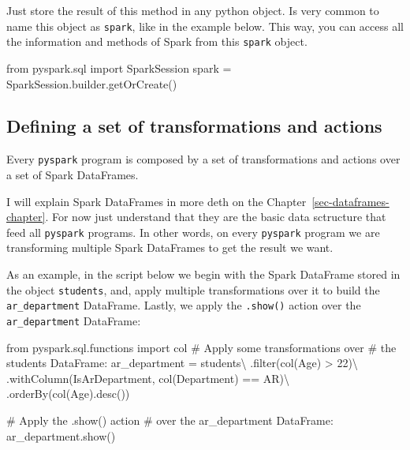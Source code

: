 \documentclass[
  11pt,
  letterpaper,
  DIV=11,
  numbers=noendperiod]{scrreprt}
\newenvironment{Shaded}{\begin{snugshade}}{\end{snugshade}}
\newcommand{\BuiltInTok}[1]{\textcolor[rgb]{0.00,0.23,0.31}{#1}}
\newcommand{\CommentTok}[1]{\textcolor[rgb]{0.37,0.37,0.37}{#1}}
\newcommand{\DecValTok}[1]{\textcolor[rgb]{0.68,0.00,0.00}{#1}}
\newcommand{\ImportTok}[1]{\textcolor[rgb]{0.00,0.46,0.62}{#1}}
\newcommand{\NormalTok}[1]{\textcolor[rgb]{0.00,0.23,0.31}{#1}}
\newcommand{\OperatorTok}[1]{\textcolor[rgb]{0.37,0.37,0.37}{#1}}
\newcommand{\StringTok}[1]{\textcolor[rgb]{0.13,0.47,0.30}{#1}}
\begin{document}
Just store the result of this method in any python object. Is very
common to name this object as \texttt{spark}, like in the example below.
This way, you can access all the information and methods of Spark from
this \texttt{spark} object.

\begin{Shaded}
\begin{Highlighting}[]
\ImportTok{from}\NormalTok{ pyspark.sql }\ImportTok{import}\NormalTok{ SparkSession}
\NormalTok{spark }\OperatorTok{=}\NormalTok{ SparkSession.builder.getOrCreate()}
\end{Highlighting}
\end{Shaded}

\hypertarget{defining-a-set-of-transformations-and-actions}{%
\subsection{Defining a set of transformations and
actions}\label{defining-a-set-of-transformations-and-actions}}

Every \texttt{pyspark} program is composed by a set of transformations
and actions over a set of Spark DataFrames.

I will explain Spark DataFrames in more deth on the
Chapter~\ref{sec-dataframes-chapter}. For now just understand that they
are the basic data sctructure that feed all \texttt{pyspark} programs.
In other words, on every \texttt{pyspark} program we are transforming
multiple Spark DataFrames to get the result we want.

As an example, in the script below we begin with the Spark DataFrame
stored in the object \texttt{students}, and, apply multiple
transformations over it to build the \texttt{ar\_department} DataFrame.
Lastly, we apply the \texttt{.show()} action over the
\texttt{ar\_department} DataFrame:

\begin{Shaded}
\begin{Highlighting}[]
\ImportTok{from}\NormalTok{ pyspark.sql.functions }\ImportTok{import}\NormalTok{ col}
\CommentTok{\# Apply some transformations over}
\CommentTok{\# the \textasciigrave{}students\textasciigrave{} DataFrame:}
\NormalTok{ar\_department }\OperatorTok{=}\NormalTok{ students}\OperatorTok{\textbackslash{}}
\NormalTok{  .}\BuiltInTok{filter}\NormalTok{(col(}\StringTok{\textquotesingle{}Age\textquotesingle{}}\NormalTok{) }\OperatorTok{\textgreater{}} \DecValTok{22}\NormalTok{)}\OperatorTok{\textbackslash{}}
\NormalTok{  .withColumn(}\StringTok{\textquotesingle{}IsArDepartment\textquotesingle{}}\NormalTok{, col(}\StringTok{\textquotesingle{}Department\textquotesingle{}}\NormalTok{) }\OperatorTok{==} \StringTok{\textquotesingle{}AR\textquotesingle{}}\NormalTok{)}\OperatorTok{\textbackslash{}}
\NormalTok{  .orderBy(col(}\StringTok{\textquotesingle{}Age\textquotesingle{}}\NormalTok{).desc())}
  
  
\CommentTok{\# Apply the \textasciigrave{}.show()\textasciigrave{} action}
\CommentTok{\# over the \textasciigrave{}ar\_department\textasciigrave{} DataFrame:}
\NormalTok{ar\_department.show()}
\end{Highlighting}
\end{Shaded}
\end{document}
